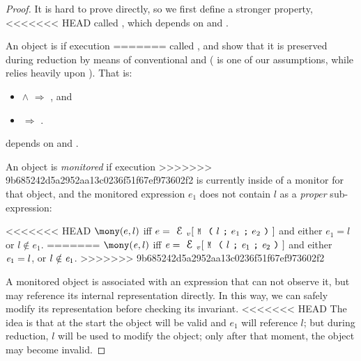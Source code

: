 \begin{Assumption}
\begin{Assumption}
\begin{Assumption}
\begin{proof}
It is hard to prove  directly,
so we first define a stronger property,
<<<<<<< HEAD
called , which depends on \mony and \OK. 

An object is \mony if execution
=======
called , and
show that it is preserved during reduction by means of conventional
 and  ( is one of our assumptions,
while  relies heavily upon ).
That is:
\SSI\begin{itemize}
\item {} $\wedge$  $\Rightarrow$ , and
\item {} $\Rightarrow$ .
\end{itemize}


 depends on \mony and \OK. 

An object is \emph{monitored} if execution
>>>>>>> 9b685242d5a2952aa13c0236f51f67ef973602f2
is currently inside of a monitor for that object, and
the monitored expression $e_1$ does not
contain $l$ as a \emph{proper} sub-expression:

<<<<<<< HEAD
\indent $\mony(e,l)$ iff
$e=\EV[\M{l}{e_1}{e_2}]$ and either $e_1=l$ or $l \notin e_1$.%
=======
\indent $\mony(\e,l)$ iff
$\e=\ctx_v[\M{l}{\e_1}{\e_2}]$ and either ${\mathit{e}}_1=l$, or $l \notin {\ensuremath{\mathit{e}}}_1$.%
>>>>>>> 9b685242d5a2952aa13c0236f51f67ef973602f2

\noindent A monitored object is associated with an expression that can not observe it, but may
reference its internal representation directly.
In this way, we can safely modify its representation before checking its invariant.
<<<<<<< HEAD
The idea is that at the start the object will be valid and $e_1$ will reference $l$;
but during reduction, $l$ will be used to
modify the object; only after that moment, the object may become invalid.


\end{proof}
\end{Assumption}
\end{Assumption}
\end{Assumption}
